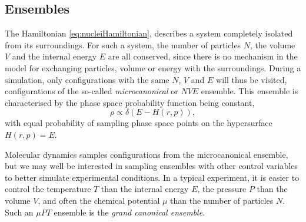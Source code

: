 \documentclass[11pt,bibliography=totoc,index=totoc]{scrbook}   %
\begin{document}




%
\subsection{Ensembles}\label{sec:ensembles}
%

The Hamiltonian \eqref{eq:nucleiHamiltonian},
describes a system completely isolated from its surroundings.
For such a system, the number of particles $N$, the volume $V$ and the internal energy $E$ are all conserved, 
since there is no mechanism in the model for exchanging particles, volume or energy with the surroundings.
During a simulation, only configurations with the same $N$, $V$ and $E$ will thus be visited, 
configurations of the so-called \emph{microcanonical} or $NVE$ ensemble. 
This ensemble is characterised by the phase space probability function being constant,
\begin{equation}
  \rho \propto \delta(E-H(r,p)),
\end{equation}
with equal probability of sampling phase space points on the hypersurface $H(r,p) = E$.

Molecular dynamics samples configurations from the microcanonical ensemble, but we may well be interested in sampling ensembles with other control variables 
to better simulate experimental conditions. 
In a typical experiment, it is easier to control the temperature $T$ than the internal energy $E$, the pressure $P$ than the volume $V$, 
and often the chemical potential $\mu$ than the number of particles $N$.
Such an $\mu P T$ ensemble is the \emph{grand canonical ensemble}.
\end{document}

